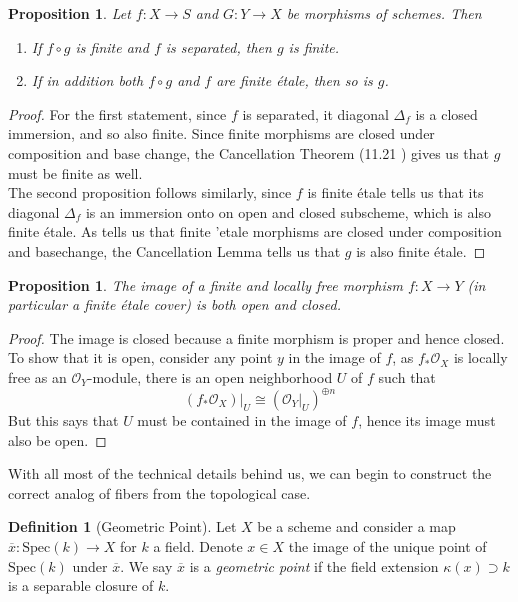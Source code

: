 \documentclass{article}
\theoremstyle{definition}
\newtheorem{definition}[theorem]{Definition}
\theoremstyle{remark}
\theoremstyle{plain}
\newtheorem{proposition}[theorem]{Proposition}
\newcommand{\mc}[1]{\mathcal{#1}}
\begin{document}
\begin{proposition}
	Let $f\colon X \to S$ and $G: Y \to X$ be morphisms of schemes. 
	Then 
	\begin{enumerate}
		\item If $f \circ g$ is finite and $f$ is separated, then $g$ is finite.
		\item If in addition both $f \circ g$ and $f$ are finite \'etale, then so is $g$.
	\end{enumerate}
	
\end{proposition}

\begin{proof}	
	For the first statement, since $f$ is separated, it diagonal $\Delta_f$ is a closed immersion, and so also finite. 
	Since finite morphisms are closed under composition and base change, the Cancellation Theorem (11.21 \cite{therisingsea}) gives us that $g$ must be finite as well.\\
\indent The second proposition follows similarly, since $f$ is finite \'etale  tells us that its diagonal $\Delta_f$ is an immersion onto on open and closed subscheme, which is also finite \'etale.
As  tells us that finite 'etale morphisms are closed under composition and basechange, the Cancellation Lemma tells us that $g$ is also finite \'etale.
\end{proof}

\begin{proposition}
	The image of a finite and locally free morphism $f: X \to Y$ (in particular a finite \'etale cover) is both open and closed.
\end{proposition}

\begin{proof}
	The image is closed because a finite morphism is proper and hence closed.
	To show that it is open, consider any point $y$ in the image of $f$, as $f_* \mc{O}_X$ is locally free as an $\mc{O}_Y$-module, there is an open neighborhood $U$ of $f$ such that 
	\[(f_* \mc{O}_X)|_U \cong (\mc{O}_Y|_U)^{\oplus n}\]
	But this says that $U$ must be contained in the image of $f$, hence its image must also be open.
\end{proof}

With all most of the technical details behind us, we can begin to construct the correct analog of fibers from the topological case.

\begin{definition}[Geometric Point]
	Let $X$ be a scheme and consider a map $\overline{x}: \text{Spec}(k) \to X$ for $k$ a field.
	Denote $x \in X$ the image of the unique point of $\text{Spec}(k)$ under $\overline{x}$.
	We say $\overline{x}$ is a \textit{geometric point} if the field extension $\kappa(x) \supset k$ is a separable closure of $k$.
\end{definition}
\end{document}
